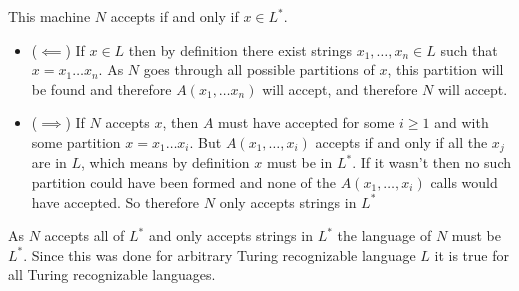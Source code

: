 \documentclass[english]{article}
\begin{document}
This machine $N$ accepts if and only if $x \in L^*$. 
\begin{itemize}
\item ($ \impliedby $) If $x \in L$ then by definition there exist strings
	$x_1, \ldots, x_n \in L$ such that $x = x_1 \ldots x_n$. As $N$
	goes through all possible partitions of $x$, this partition will be
	found and therefore $A(x_1,\ldots x_n)$ will accept, and therefore
	$N$ will accept.
\item ($ \implies $) If $N$ accepts $x$, then $A$ must have accepted
	for some $i \ge 1$ and with some partition $x = x_1 \ldots x_i$.
	But $A(x_1, \ldots, x_i)$ accepts if and only if all the $x_j$ are
	in $L$, which means by definition $x$ must be in $L^*$. If it wasn't
	then no such partition could have been formed and none of the 
	$A(x_1,\ldots,x_i)$ calls would have accepted. So therefore $N$ only
	accepts strings in $L^*$
\end{itemize}

As $N$ accepts all of $L^*$ and only accepts strings in $L^*$ the language
of $N$ must be $L^*$. Since this was done for arbitrary Turing recognizable
language $L$ it is true for all Turing recognizable languages.
\end{document}
